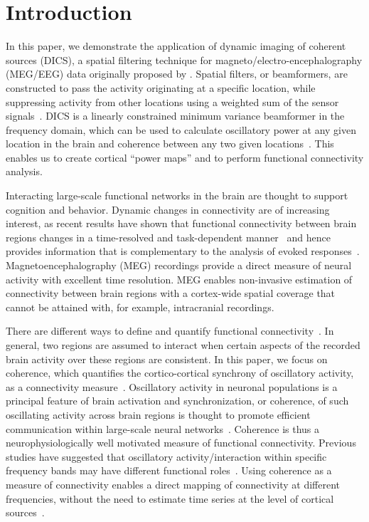 \documentclass[utf8]{frontiersSCNS}
\renewcommand{\cite}[1]{~\citep{#1}}
\newcommand{\textcite}[1]{\citet{#1}}
\begin{document}
\section{Introduction}\label{introduction}

In this paper, we demonstrate the application of dynamic imaging of coherent sources (DICS), a spatial filtering technique for magneto/electro-encephalography (MEG/EEG) data originally proposed by \textcite{Gross2001}.
Spatial filters, or beamformers, are constructed to pass the activity originating at a specific location, while suppressing activity from other locations using a weighted sum of the sensor signals\cite{VanVeen1997}.
DICS is a linearly constrained minimum variance beamformer in the frequency domain, which can be used to calculate oscillatory power at any given location in the brain and coherence between any two given locations\cite{Gross2001, Kujala2008}.
This enables us to create cortical ``power maps'' and to perform functional connectivity analysis.

Interacting large-scale functional networks in the brain are thought to support cognition and behavior.
Dynamic changes in connectivity are of increasing interest, as recent results have shown that functional connectivity between brain regions changes in a time-resolved and task-dependent manner\cite{Liljestrom2015a, Betti2013, Gonzalez-Castillo2017, Liljestrom2018} and hence provides information that is complementary to the analysis of evoked responses\cite{Laaksonen2012b, Salmelin2006}.
Magnetoencephalography (MEG) recordings provide a direct measure of neural activity with excellent time resolution.
MEG enables non-invasive estimation of connectivity between brain regions with a cortex-wide spatial coverage that cannot be attained with, for example, intracranial recordings.

There are different ways to define and quantify functional connectivity\cite{Schoffelen2009a}.
In general, two regions are assumed to interact when certain aspects of the recorded brain activity over these regions are consistent.
In this paper, we focus on coherence, which quantifies the cortico-cortical synchrony of oscillatory activity, as a connectivity measure\cite{Gross2001}.
Oscillatory activity in neuronal populations is a principal feature of brain activation and synchronization, or coherence, of such oscillating activity across brain regions is thought to promote efficient communication within large-scale neural networks\cite{Bressler2001, Fries2005}.
Coherence is thus a neurophysiologically well motivated measure of functional connectivity.
Previous studies have suggested that oscillatory activity/interaction within specific frequency bands may have different functional roles\cite{Buffalo2011, Donner2011, Hipp2012, Liljestrom2015a}.
Using coherence as a measure of connectivity enables a direct mapping of connectivity at different frequencies, without the need to estimate time series at the level of cortical sources\cite{Kujala2008}.
\end{document}
